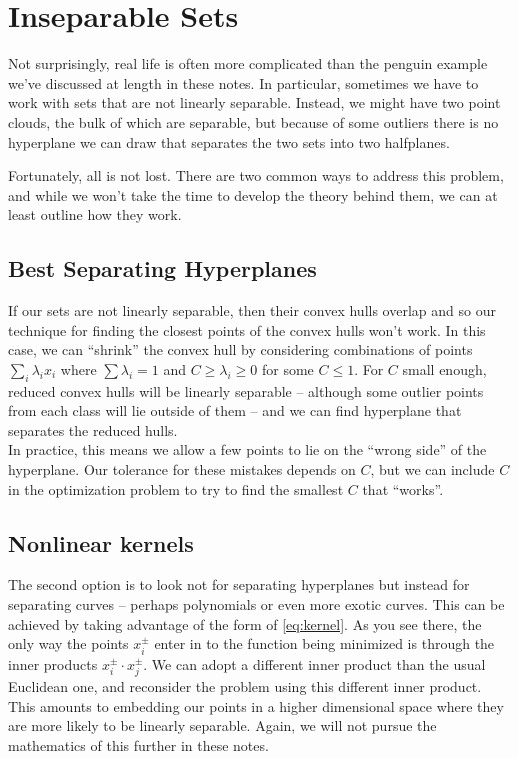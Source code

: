 \documentclass[
  oneside]{scrbook}
\begin{document}
\hypertarget{inseparable-sets}{%
\section{Inseparable Sets}\label{inseparable-sets}}

Not surprisingly, real life is often more complicated than the penguin
example we've discussed at length in these notes. In particular,
sometimes we have to work with sets that are not linearly separable.
Instead, we might have two point clouds, the bulk of which are
separable, but because of some outliers there is no hyperplane we can
draw that separates the two sets into two halfplanes.

Fortunately, all is not lost. There are two common ways to address this
problem, and while we won't take the time to develop the theory behind
them, we can at least outline how they work.

\hypertarget{best-separating-hyperplanes}{%
\subsection{Best Separating
Hyperplanes}\label{best-separating-hyperplanes}}

If our sets are not linearly separable, then their convex hulls overlap
and so our technique for finding the closest points of the convex hulls
won't work. In this case, we can ``shrink'' the convex hull by
considering combinations of points \(\sum_{i}\lambda_{i}x_{i}\) where
\(\sum\lambda_{i}=1\) and \(C\ge\lambda_{i}\ge 0\) for some \(C\le 1\).
For \(C\) small enough, reduced convex hulls will be linearly separable
-- although some outlier points from each class will lie outside of them
-- and we can find hyperplane that separates the reduced hulls.\\
In practice, this means we allow a few points to lie on the ``wrong
side'' of the hyperplane. Our tolerance for these mistakes depends on
\(C\), but we can include \(C\) in the optimization problem to try to
find the smallest \(C\) that ``works''.

\hypertarget{nonlinear-kernels}{%
\subsection{Nonlinear kernels}\label{nonlinear-kernels}}

The second option is to look not for separating hyperplanes but instead
for separating curves -- perhaps polynomials or even more exotic curves.
This can be achieved by taking advantage of the form of
\cref{eq:kernel}. As you see there, the only way the points
\(x_{i}^{\pm}\) enter in to the function being minimized is through the
inner products \(x_{i}^{\pm}\cdot x_{j}^{\pm}\). We can adopt a
different inner product than the usual Euclidean one, and reconsider the
problem using this different inner product. This amounts to embedding
our points in a higher dimensional space where they are more likely to
be linearly separable. Again, we will not pursue the mathematics of this
further in these notes.
\end{document}
